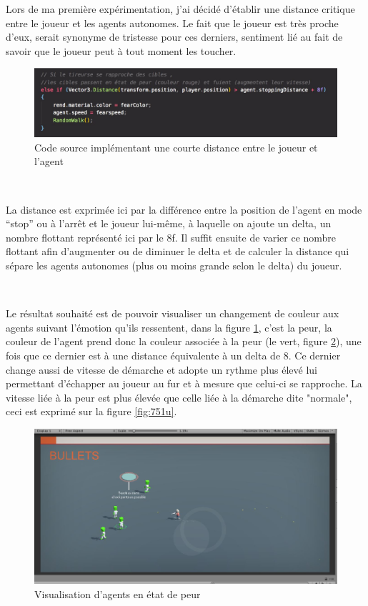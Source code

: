 Lors de ma première expérimentation, j’ai décidé d’établir une distance critique entre le joueur et les agents autonomes. Le fait que le joueur est très proche d’eux, serait synonyme de tristesse pour ces derniers, sentiment lié au fait de savoir que le joueur peut à tout moment les toucher.


\begin{figure}[th]
\centering
\includegraphics{Figures/fonctdist.JPG}
\decoRule
\caption[Code source implémentant une courte distance ]{Code source implémentant une courte distance entre le joueur et l'agent}
\label{fig:751}
\end{figure}



~\par
La distance est exprimée ici par la différence entre la position de l’agent en mode “stop” ou à l'arrêt et le joueur lui-même, à laquelle on ajoute un delta, un nombre flottant représenté ici par le 8f. Il suffit ensuite de varier ce nombre flottant afin d’augmenter ou de diminuer le delta et de calculer la distance qui sépare les agents autonomes (plus ou moins grande selon le delta) du joueur. 

~\par
Le résultat souhaité est de pouvoir visualiser un changement de couleur aux agents suivant l’émotion qu’ils ressentent, dans la figure \ref{fig:751}, c’est la peur, la couleur de l’agent prend donc la couleur associée à la peur (le vert, figure \ref{fig:bichi1}), une fois que ce dernier est à une distance équivalente à un delta de 8. Ce dernier change aussi de vitesse de démarche et adopte un rythme plus élevé lui permettant d'échapper au joueur au fur et à mesure que celui-ci se rapproche. La vitesse liée à la peur est plus élevée que celle liée à la démarche dite "normale", ceci est exprimé sur la figure \ref{fig:751u}.


\begin{figure}[th]
\centering
\includegraphics{Figures/bichi1.JPG}
\decoRule
\caption[Visualisation d'agents en état de peur]{Visualisation d'agents en état de peur}
\label{fig:bichi1}
\end{figure}




